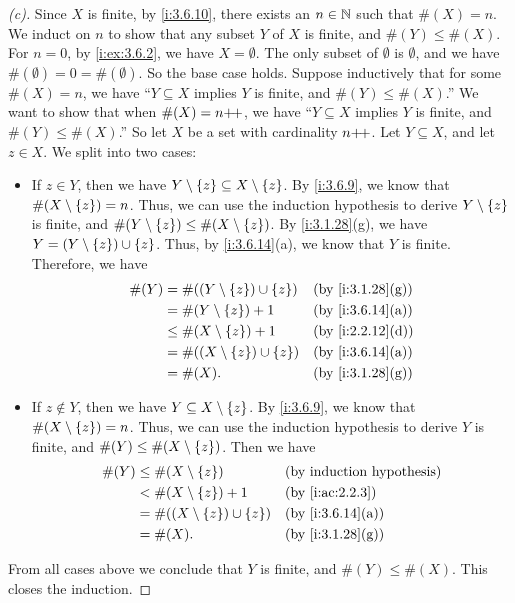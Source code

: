 \begin{proof}[(c)]
  Since \(X\) is finite, by \cref{i:3.6.10}, there exists an \(n \in \mathbb{N}\) such that \(\#(X) = n\).
  We induct on \(n\) to show that any subset \(Y\) of \(X\) is finite, and \(\#(Y) \leq \#(X)\).
  For \(n = 0\), by \cref{i:ex:3.6.2}, we have \(X = \emptyset\).
  The only subset of \(\emptyset\) is \(\emptyset\), and we have \(\#(\emptyset) = 0 = \#(\emptyset)\).
  So the base case holds.
  Suppose inductively that for some \(\#(X) = n\), we have ``\(Y \subseteq X\) implies \(Y\) is finite, and \(\#(Y) \leq \#(X)\).''
  We want to show that when \(\#(X) = n{+}\!{+}\), we have ``\(Y \subseteq X\) implies \(Y\) is finite, and \(\#(Y) \leq \#(X)\).''
  So let \(X\) be a set with cardinality \(n{+}\!{+}\).
  Let \(Y \subseteq X\), and let \(z \in X\).
  We split into two cases:
  \begin{itemize}
    \item If \(z \in Y\), then we have \(Y \setminus \left\lbrace z\right\rbrace \subseteq X \setminus \left\lbrace z\right\rbrace\).
          By \cref{i:3.6.9}, we know that \(\#(X \setminus \left\lbrace z\right\rbrace) = n\).
          Thus, we can use the induction hypothesis to derive \(Y \setminus \left\lbrace z\right\rbrace\) is finite, and \(\#(Y \setminus \left\lbrace z\right\rbrace) \leq \#(X \setminus \left\lbrace z\right\rbrace)\).
          By \cref{i:3.1.28}(g), we have \(Y = (Y \setminus \left\lbrace z\right\rbrace) \cup \left\lbrace z\right\rbrace\).
          Thus, by \cref{i:3.6.14}(a), we know that \(Y\) is finite.
          Therefore, we have
          \begin{align*}
            \#(Y) & = \#((Y \setminus \set{z}) \cup \set{z}) &  & \by{i:3.1.28}[g] \\
                  & = \#(Y \setminus \set{z}) + 1            &  & \by{i:3.6.14}[a] \\
                  & \leq \#(X \setminus \set{z}) + 1         &  & \by{i:2.2.12}[d] \\
                  & = \#((X \setminus \set{z}) \cup \set{z}) &  & \by{i:3.6.14}[a] \\
                  & = \#(X).                                 &  & \by{i:3.1.28}[g]
          \end{align*}
    \item If \(z \notin Y\), then we have \(Y \subseteq X \setminus \left\lbrace z\right\rbrace\).
          By \cref{i:3.6.9}, we know that \(\#(X \setminus \left\lbrace z\right\rbrace) = n\).
          Thus, we can use the induction hypothesis to derive \(Y\) is finite, and \(\#(Y) \leq \#(X \setminus \left\lbrace z\right\rbrace)\).
          Then we have
          \begin{align*}
            \#(Y) & \leq \#(X \setminus \set{z})             &  & \byIH            \\
                  & < \#(X \setminus \set{z}) + 1            &  & \by{i:ac:2.2.3}  \\
                  & = \#((X \setminus \set{z}) \cup \set{z}) &  & \by{i:3.6.14}[a] \\
                  & = \#(X).                                 &  & \by{i:3.1.28}[g]
          \end{align*}
  \end{itemize}
  From all cases above we conclude that \(Y\) is finite, and \(\#(Y) \leq \#(X)\).
  This closes the induction.


\end{proof}
